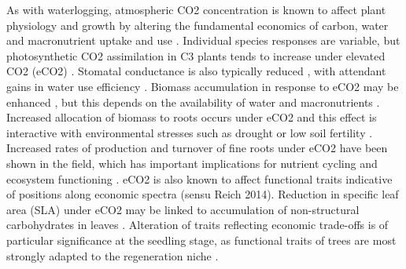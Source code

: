 \documentclass[12pt,a4paper]{memoir}
\begin{document}
As with waterlogging, atmospheric CO2 concentration is known to affect plant physiology and growth by altering the fundamental economics of carbon, water and macronutrient uptake and use \citep{Poorter2003a, Wang2012, Reich2014}.  Individual species responses are variable, but photosynthetic CO2 assimilation in C3 plants tends to increase under elevated CO2 (eCO2) \citep{Curtis1996}. Stomatal conductance is also typically reduced \citep{Ainsworth2007}, with attendant gains in water use efficiency \citep{Holtum2010, Keenan2013, VanderSleen2014}. Biomass accumulation in response to eCO2 may be enhanced \citep{Wang2012}, but this depends on the availability of water and macronutrients \citep{Korner2006, Manea2014, Reich2014}. Increased allocation of biomass to roots occurs under eCO2 \citep{Nie2013} and this effect is interactive with environmental stresses such as drought or low soil fertility \citep{Wang2010}. Increased rates of production and turnover of fine roots under eCO2 have been shown in the field, which has important implications for nutrient cycling and ecosystem functioning \citep{Pregitzer1995, Pregitzer2000, Matamala2000, Lipson2014}. eCO2 is also known to affect functional traits indicative of positions along economic spectra (sensu Reich 2014). Reduction in specific leaf area (SLA) under eCO2 may be linked to accumulation of non-structural carbohydrates in leaves \citep{Poorter2003a, Bader2010}. Alteration of traits reflecting economic trade-offs is of particular significance at the seedling stage, as functional traits of trees are most strongly adapted to the regeneration niche \citep{Poorter2007}.
\end{document}
